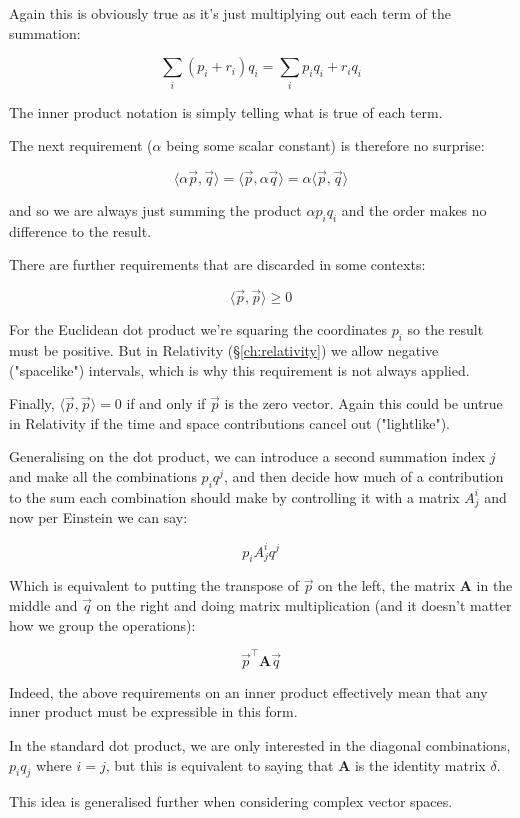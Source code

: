 Again this is obviously true as it's just multiplying out each term of the summation:

$$\sum_i (p_i + r_i)q_i = \sum_i p_iq_i + r_iq_i$$

The inner product notation is simply telling what is true of each term.

The next requirement ($\alpha$ being some scalar constant) is therefore no surprise:

$$\langle \alpha \vec{p},\vec{q}\rangle = \langle \vec{p},\alpha \vec{q}\rangle = \alpha \langle \vec{p},\vec{q}\rangle$$

and so we are always just summing the product $\alpha p_i q_i$ and the order makes no difference to the result.

There are further requirements that are discarded in some contexts:

$$\langle \vec{p},\vec{p}\rangle \geq 0$$

For the Euclidean dot product we're squaring the coordinates $p_i$ so the result must be positive. But in Relativity (§\ref{ch:relativity}) we allow negative ("spacelike") intervals, which is why this requirement is not always applied.

Finally, $\langle \vec{p},\vec{p}\rangle = 0$ if and only if $\vec{p}$ is the zero vector. Again this could be untrue in Relativity if the time and space contributions cancel out ("lightlike").

Generalising on the dot product, we can introduce a second summation index $j$ and make all the combinations $p_iq^j$, and then decide how much of a contribution to the sum each combination should make by controlling it with a matrix $A^i_j$ and now per Einstein we can say:

$$p_i A^i_j q^j$$

Which is equivalent to putting the transpose of $\vec{p}$ on the left, the matrix $\mathbf{A}$ in the middle and $\vec{q}$ on the right and doing matrix multiplication (and it doesn't matter how we group the operations):

$$\vec{p}^\intercal\mathbf{A}\vec{q}$$

Indeed, the above requirements on an inner product effectively mean that any inner product must be expressible in this form.

In the standard dot product, we are only interested in the diagonal combinations, $p_i q_j$ where $i=j$, but this is equivalent to saying that $\mathbf{A}$ is the identity matrix $\delta$.

This idea is generalised further when considering complex vector spaces.

